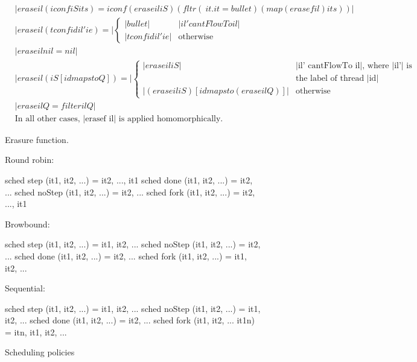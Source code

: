 \begin{figure}
\begin{align*}
  &|erase il (iconf iS its) =
  iconf (erase il iS) (fltr (\ it . it = bullet) (map (erasef il) its))| \\
  &|erase il (tconf id il' ie) =| \begin{cases}
    |bullet| & |il' cantFlowTo il| \\
    |tconf id il' ie| & \text{otherwise}
  \end{cases} \\
  &|erase il nil = nil|\\
  &|erase il (iS [id mapsto Q]) =| \begin{cases}
    |erase il iS| & \text{|il' cantFlowTo il|, where |il'| is}\\
    & \text{the label of thread |id|} \\
    |(erase il iS) [id mapsto (erase il Q)]| & \text{otherwise}
  \end{cases} \\
  &|erase il Q = filter il Q|\\
  &\text{In all other cases, |erasef il| is applied homomorphically.}
\end{align*}
\caption{Erasure function.}
\end{figure}


\begin{figure}
  Round robin:
\begin{code}
  sched step (it1, it2, ...)    = {it2, ..., it1}
  sched done (it1, it2, ...)    = {it2, ...}
  sched noStep (it1, it2, ...)  = {it2, ...}
  sched fork (it1, it2, ...)    = {it2, ..., it1}
\end{code}
  Browbound:
\begin{code}
  sched step (it1, it2, ...)    = {it1, it2, ...}
  sched noStep (it1, it2, ...)  = {it2, ...}
  sched done (it1, it2, ...)    = {it2, ...}
  sched fork (it1, it2, ...)    = {it1, it2, ...}
\end{code}
  Sequential:
\begin{code}
  sched step (it1, it2, ...)       = {it1, it2, ...}
  sched noStep (it1, it2, ...)     = {it1, it2, ...}
  sched done (it1, it2, ...)       = {it2, ...}
  sched fork (it1, it2, ... it1n)  = {itn, it1, it2, ...}
\end{code}
\caption{Scheduling policies}
\end{figure}


